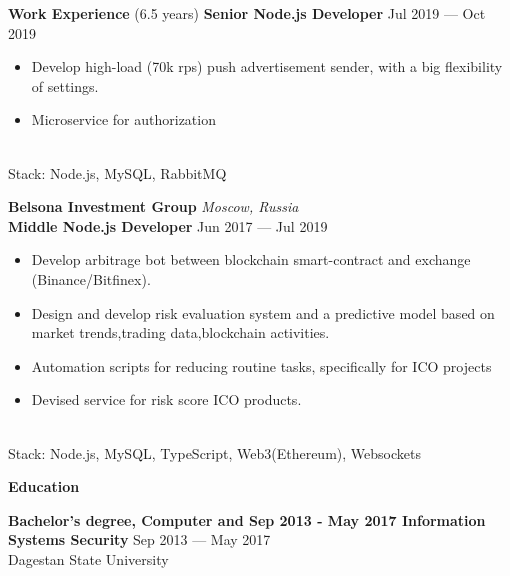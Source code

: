 \documentclass{resume} %
\begin{document}
\begin{rSection}{\textbf{Work Experience} (6.5 years) }
\textbf{Senior Node.js Developer} \hfill Jul 2019 --- Oct 2019
\begin{itemize}
    \setlength\itemsep{-0.4em}
    \item Develop high-load (70k rps) push advertisement sender, with a big flexibility of settings.
    \item Microservice for authorization
\end{itemize}
\\Stack: Node.js, MySQL, RabbitMQ

\textbf{Belsona Investment Group} \hfill \textit{Moscow, Russia} \\
\textbf{Middle Node.js Developer}  \hfill Jun 2017 --- Jul 2019

\begin{itemize}
    \setlength\itemsep{-0.4em}
    \item Develop arbitrage bot between blockchain smart-contract and exchange (Binance/Bitfinex).
    \item Design and develop risk evaluation system and a predictive model based on market trends,trading data,blockchain activities.
    \item Automation scripts for reducing routine tasks, specifically for ICO projects
    \item Devised service for risk score ICO products.
\end{itemize}
\\Stack: Node.js, MySQL, TypeScript, Web3(Ethereum), Websockets

\end{rSection}



\begin{rSection}{\textbf{Education}}

\textbf{Bachelor's degree, Computer and Sep 2013 - May 2017 Information Systems Security} \hfill {Sep 2013 --- May 2017} \\
	  Dagestan State University

\end{rSection}
\end{document}
